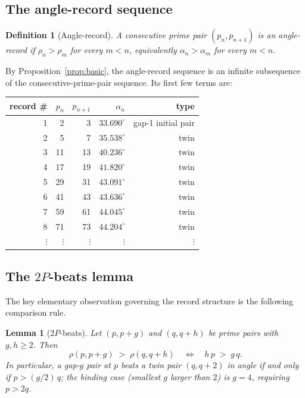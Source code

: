 \documentclass[11pt]{article}
\newtheorem{lemma}[theorem]{Lemma}
\newtheorem{definition}[theorem]{Definition}
\begin{document}
\subsection{The angle-record sequence}

\begin{definition}[Angle-record]
A consecutive prime pair $(p_n, p_{n+1})$ is an
\emph{angle-record} if
$\rho_n > \rho_m$ for every $m < n$, equivalently
$\alpha_n > \alpha_m$ for every $m < n$.
\end{definition}

By Proposition~\ref{prop:basic}, the angle-record sequence is an
infinite subsequence of the consecutive-prime-pair sequence. Its
first few terms are:

\begin{center}
\begin{tabular}{rrrrr}
\toprule
record \# & $p_n$ & $p_{n+1}$ & $\alpha_n$ & type \\
\midrule
1 & 2 & 3 & $33.690^\circ$ & gap-1 initial pair \\
2 & 5 & 7 & $35.538^\circ$ & twin \\
3 & 11 & 13 & $40.236^\circ$ & twin \\
4 & 17 & 19 & $41.820^\circ$ & twin \\
5 & 29 & 31 & $43.091^\circ$ & twin \\
6 & 41 & 43 & $43.636^\circ$ & twin \\
7 & 59 & 61 & $44.045^\circ$ & twin \\
8 & 71 & 73 & $44.204^\circ$ & twin \\
$\vdots$ & $\vdots$ & $\vdots$ & $\vdots$ & $\vdots$ \\
\bottomrule
\end{tabular}
\end{center}

\subsection{The \texorpdfstring{$2P$}{2P}-beats lemma}

The key elementary observation governing the record structure is
the following comparison rule.

\begin{lemma}[$2P$-beats]\label{lem:2P}
Let $(p, p+g)$ and $(q, q+h)$ be prime pairs with $g, h \ge 2$. Then
\[
\rho(p, p+g) \;>\; \rho(q, q+h)
\quad\Longleftrightarrow\quad
h\, p \;>\; g\, q.
\]
In particular, a gap-$g$ pair at $p$ beats a twin pair $(q, q+2)$ in
angle if and only if $p > (g/2)\, q$; the binding case (smallest $g$
larger than $2$) is $g = 4$, requiring $p > 2q$.
\end{lemma}
\end{document}
